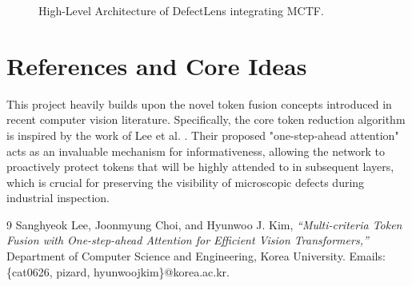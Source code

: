 \documentclass[12pt]{article}
\begin{document}
\begin{figure}[htpb]
    \centering
    \caption{High-Level Architecture of DefectLens integrating MCTF.}
    \label{fig:architecture}
\end{figure}

\section{References and Core Ideas}
This project heavily builds upon the novel token fusion concepts introduced in recent computer vision literature. Specifically, the core token reduction algorithm is inspired by the work of Lee et al. \cite{lee2023multi}. Their proposed "one-step-ahead attention" acts as an invaluable mechanism for informativeness, allowing the network to proactively protect tokens that will be highly attended to in subsequent layers, which is crucial for preserving the visibility of microscopic defects during industrial inspection.

\begin{thebibliography}{9}
Sanghyeok Lee, Joonmyung Choi, and Hyunwoo J. Kim,
\textit{``Multi-criteria Token Fusion with One-step-ahead Attention for Efficient Vision Transformers,''}
Department of Computer Science and Engineering, Korea University.
Emails: \{cat0626, pizard, hyunwoojkim\}@korea.ac.kr.
\end{thebibliography}
\end{document}
